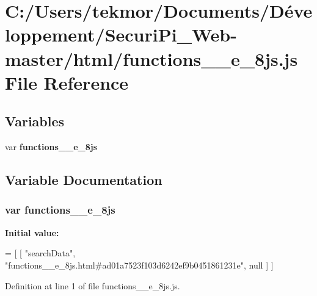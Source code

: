 \section{C\+:/\+Users/tekmor/\+Documents/\+Développement/\+Securi\+Pi\+\_\+\+Web-\/master/html/functions\+\_\+\+\_\+e\+\_\+8js.js File Reference}
\label{functions____e__8js_8js}
\subsection*{Variables}
\begin{DoxyCompactItemize}
\item 
var {\bf functions\+\_\+\+\_\+e\+\_\+8js}
\end{DoxyCompactItemize}


\subsection{Variable Documentation}
\subsubsection[{functions\+\_\+\+\_\+e\+\_\+8js}]{\setlength{\rightskip}{0pt plus 5cm}var functions\+\_\+\+\_\+e\+\_\+8js}\label{functions____e__8js_8js_a348cc5f302b99d168d2ac735a7d1c4e1}
{\bfseries Initial value\+:}
\begin{DoxyCode}
=
[
    [ \textcolor{stringliteral}{"searchData"}, \textcolor{stringliteral}{"functions\_\_e\_8js.html#ad01a7523f103d6242ef9b0451861231e"}, null ]
]
\end{DoxyCode}


Definition at line 1 of file functions\+\_\+\+\_\+e\+\_\+8js.\+js.

